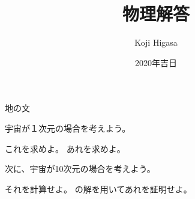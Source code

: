 \documentclass[a4paper,12pt]{jsarticle}
\title{物理解答}
\author{Koji Higasa}
\date{2020年吉日}
\begin{document}
\maketitle

地の文~\cite{qm_sunagawa}
\begin{qparts}
    \qpart 宇宙が１次元の場合を考えよう。
        \begin{qlist}
            \qitem これを求めよ。
            \qitem あれを求めよ。
        \end{qlist}
    \qpart 次に、宇宙が10次元の場合を考えよう。
        \begin{qlist}
            \qitem それを計算せよ。\label{q:10dim}
            \qitem {}の解を用いてあれを証明せよ。
        \end{qlist}
\end{qparts}



\end{document}
